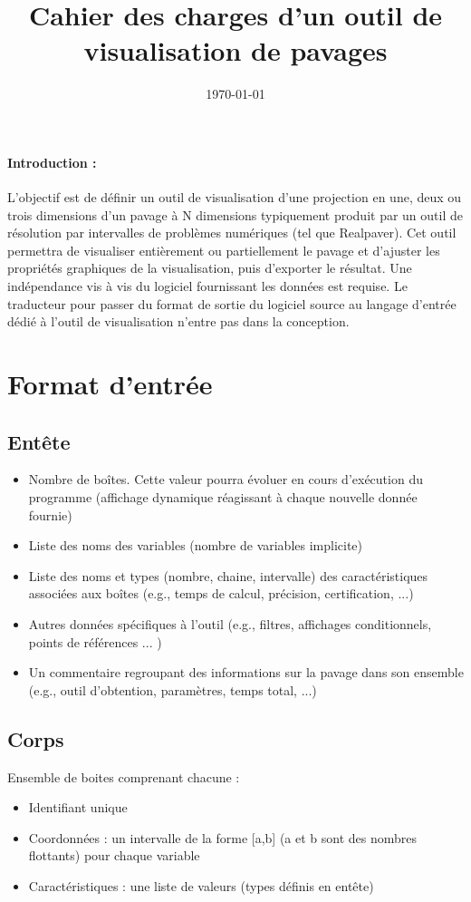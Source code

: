 \documentclass{article}
\title{\textbf{Cahier des charges d'un outil de visualisation de pavages}}
\date{\today}
\begin{document}
\maketitle{}                                   %
\paragraph{Introduction :} L'objectif est de définir un outil de visualisation d'une projection en une, deux ou trois dimensions d'un pavage à N dimensions typiquement produit par un outil de résolution par intervalles de problèmes numériques (tel que Realpaver). Cet outil permettra de visualiser entièrement ou partiellement le pavage et d'ajuster les propriétés graphiques de la visualisation, puis d'exporter le résultat. Une indépendance vis à vis du logiciel fournissant les données est requise. Le traducteur pour passer du format de sortie du logiciel source au langage d'entrée dédié à l'outil de visualisation n'entre pas dans la conception.
\section{Format d'entrée}
\subsection{Entête}
\begin{itemize}
\item
Nombre de  boîtes. Cette valeur pourra évoluer en cours d'exécution du programme (affichage dynamique réagissant à chaque nouvelle donnée fournie)
\item
Liste des noms des variables (nombre de variables implicite)
\item
Liste des noms et types (nombre, chaine, intervalle) des caractéristiques associées aux boîtes (e.g., temps de calcul, précision, certification, ...)
\item
Autres données spécifiques à l'outil (e.g., filtres, affichages conditionnels, points de références ... )
\item
Un commentaire regroupant des informations sur la pavage dans son ensemble (e.g., outil d'obtention, paramètres, temps total, ...)
\end{itemize}

\subsection{Corps}
Ensemble de boites comprenant chacune :
\begin{itemize}
\item
Identifiant unique
\item
Coordonnées : un intervalle de la forme [a,b] (a et b sont des nombres flottants) pour chaque variable
\item
Caractéristiques : une liste de valeurs (types définis en entête)
\end{itemize}
\end{document}
